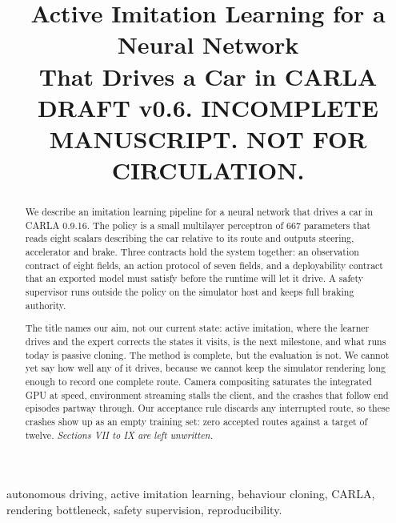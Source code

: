 \documentclass[conference]{IEEEtran}
\begin{document}
\title{Active Imitation Learning for a Neural Network\\ That Drives a Car in CARLA\\[3pt]
{\normalsize\color{red!65!black}\bfseries DRAFT v0.6. INCOMPLETE MANUSCRIPT. NOT FOR CIRCULATION.}}

\author{
}

\maketitle

\begin{abstract}
We describe an imitation learning pipeline for a neural network that
drives a car in CARLA 0.9.16. The policy is a small multilayer
perceptron of 667 parameters that reads eight scalars describing the car
relative to its route and outputs steering, accelerator and brake. Three
contracts hold the system together: an observation contract of eight
fields, an action protocol of seven fields, and a deployability contract
that an exported model must satisfy before the runtime will let it
drive. A safety supervisor runs outside the policy on the simulator host
and keeps full braking authority.

The title names our aim, not our current state: active imitation, where
the learner drives and the expert corrects the states it visits, is the
next milestone, and what runs today is passive cloning. The method is
complete, but the evaluation is not. We cannot yet say how well any of
it drives, because we cannot keep the simulator rendering long enough to
record one complete route. Camera compositing saturates the integrated
GPU at speed, environment streaming stalls the client, and the crashes
that follow end episodes partway through. Our acceptance rule discards
any interrupted route, so these crashes show up as an empty training
set: zero accepted routes against a target of twelve.
\textit{Sections VII to IX are left unwritten.}
\end{abstract}

\begin{IEEEkeywords}
autonomous driving, active imitation learning, behaviour cloning, CARLA,
rendering bottleneck, safety supervision, reproducibility.
\end{IEEEkeywords}
\end{document}
